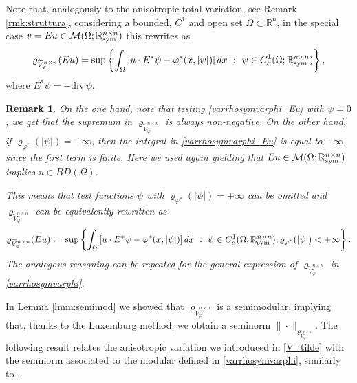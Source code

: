 \documentclass[a4paper,11pt,oneside,notitlepage]{article}
\newtheorem{remark}[theorem]{Remark}
\numberwithin{equation}{section}
\def\R{\mathbb{R}}
\def\M{\mathcal{M}}
\def\sym{{\rm sym}}
\renewcommand{\div}{\mathrm{div}}
\newcommand{\vphi}{\varphi}
\newcommand{\vrho}{\varrho}
\newcommand{\st}{ \ : \ }
\begin{document}
Note that, analogously to the anisotropic total variation, see Remark \ref{rmk:struttura}, considering a bounded, $C^1$ and open set $\Omega \subset \R^n$, in the special case $v = Eu \in \M(\Omega; \R^{n \times n}_\sym)$ this rewrites as
\begin{equation}
\label{varrhosymvarphi_Eu}
    \vrho_{\widetilde{V}^{n \times n}_\vphi}(Eu) = \sup \left\{ \int_\Omega \left[u \cdot E^*\psi - \vphi^*(x,|\psi|) \right] dx \st \psi \in C^1_c(\Omega; \R^{n \times n}_\sym) \right\},
\end{equation}
where $E^*\psi = - \div \, \psi$.



\begin{remark}
\label{rmk:test_mod}
    On the one hand, note that testing \eqref{varrhosymvarphi_Eu} with $\psi = 0$, we get that the supremum in $\vrho_{\widetilde{V}^{n \times n}_\vphi}$ is always non-negative. On the other hand, if $\vrho_{\vphi^*}(|\psi|) = +\infty$, then the integral in \eqref{varrhosymvarphi_Eu} is equal to $-\infty$, since the first term is finite. Here we used again  \cite[Chapter II, Theorem 2.3]{temam} yielding that $Eu \in \M(\Omega;\R^{n\times n}_\sym)$ implies $u \in BD(\Omega)$.
    
    
    
    This means that test functions $\psi$ with $\vrho_{\vphi^*}(|\psi|) = +\infty$ can be omitted and $\vrho_{\widetilde{V}^{n \times n}_\vphi}$ can be equivalently rewritten as
    \begin{equation*}
        \vrho_{\widetilde{V}^{n \times n}_\vphi}(Eu) := \sup \left\{ \int_\Omega \left[u \cdot E^*\psi - \vphi^*(x,|\psi|) \right] dx \st \psi \in C^1_c(\Omega; \R^{n \times n}_\sym), \vrho_{\vphi^*}(|\psi|) < +\infty \right\}.
    \end{equation*}
    The analogous reasoning can be repeated for the general expression of $\vrho_{\widetilde{V}^{n \times n}_\vphi}$ in \eqref{varrhosymvarphi}.
\end{remark}

In Lemma \ref{lmm:semimod} we showed that $\vrho_{\widetilde{V}^{n \times n}_\vphi}$ is a semimodular, implying that, thanks to the Luxemburg method, we obtain a seminorm $\|\cdot\|_{\vrho_{\widetilde{V}^{n \times n}_\vphi}}$. The following result relates the anisotropic variation we introduced in \eqref{V_tilde} with the seminorm associated to the modular defined in \eqref{varrhosymvarphi}, similarly to \cite[Lemma 4.7]{EHH}.
\end{document}
